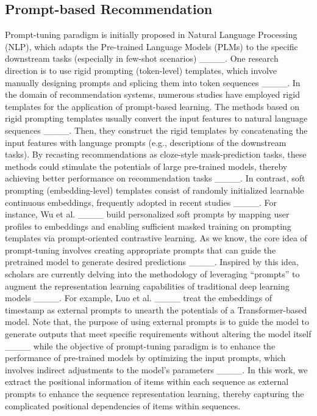\subsection{Prompt-based Recommendation}
\noindent Prompt-tuning paradigm is initially proposed in Natural Language Processing (NLP), which adapts the Pre-trained Language Models (PLMs) to the specific downstream tasks (especially in few-shot scenarios) ____.
One research direction is to use rigid prompting (token-level) templates, which involve manually designing prompts and splicing them into token sequences ____. In the domain of recommendation systems, numerous studies have employed rigid templates for the application of prompt-based learning. The methods based on rigid prompting templates usually convert the input features to natural language sequences ____. Then, they construct the rigid templates by concatenating the input features with language prompts (e.g., descriptions of the downstream tasks). By recasting recommendations as cloze-style mask-prediction tasks, these methods could stimulate the potentials of large pre-trained models, thereby achieving better performance on recommendation tasks ____.
In contrast, soft prompting (embedding-level) templates consist of randomly initialized learnable continuous embeddings, frequently adopted in recent studies ____. For instance, Wu et al. ____ build personalized soft prompts by mapping user profiles to embeddings and enabling sufficient masked training on prompting templates via prompt-oriented contrastive learning.
As we know, the core idea of prompt-tuning involves creating appropriate prompts that can guide the pretrained model to generate desired predictions ____. Inspired by this idea, scholars are currently delving into the methodology of leveraging “prompts” to augment the representation learning capabilities of traditional deep learning models ____. For example, Luo et al. ____ treat the embeddings of timestamp as external prompts to unearth the potentials of a Transformer-based model. Note that, the purpose of using external prompts is to guide the model to generate outputs that meet specific requirements without altering the model itself ____ while the objective of prompt-tuning paradigm is to enhance the performance of pre-trained models by optimizing the input prompts, which involves indirect adjustments to the model's parameters ____. In this work, we extract the positional information of items within each sequence as external prompts to enhance the sequence representation learning, thereby capturing the complicated positional dependencies of items within sequences.


